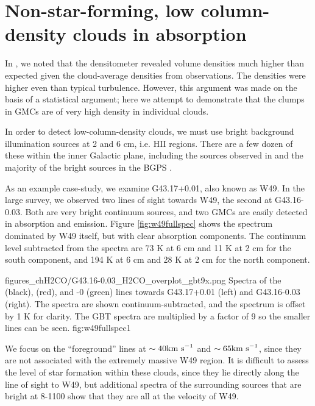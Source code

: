 \section{Non-star-forming, low column-density clouds in absorption}
In \citet{Ginsburg2011a}, we noted that the \formaldehyde densitometer revealed
volume densities much higher than expected given the cloud-average densities
from \thirteenco observations.  The densities were higher even than typical
turbulence.  However, this argument was made on the basis of a statistical argument;
here we attempt to demonstrate that the clumps in GMCs are of very high density
in individual clouds.

In order to detect low-column-density clouds, we must use bright background
illumination sources at 2 and 6 cm, i.e. HII regions.  There are a few dozen of
these within the inner Galactic plane, including the sources observed in
\citet{Ginsburg2011a} and the majority of the bright sources in the BGPS
\citep{Ginsburg2012}.

As an example case-study, we examine G43.17+0.01, also known as W49.  In the
large survey, we observed two lines of sight towards W49, the second at
G43.16-0.03.  Both are very bright continuum sources, and two GMCs are easily
detected in \formaldehyde absorption and \thirteenco emission.  Figure
\ref{fig:w49fullspec} shows the spectrum dominated by W49 itself, but with
clear absorption components.  The continuum level subtracted from the spectra
are 73 K at 6 cm and 11 K at 2 cm for the south component, and 194 K at 6 cm
and 28 K at 2 cm for the north component.

{figures_chH2CO/G43.16-0.03_H2CO_overplot_gbt9x.png}
{Spectra of the \formaldehyde \oneone (black), \twotwo (red), and -0 (green) lines towards G43.17+0.01 (left) and G43.16-0.03 (right).
The \formaldehyde spectra are shown continuum-subtracted, and the \thirteenco
spectrum is offset by 1 K for clarity.  The GBT \twotwo spectra are multiplied
by a factor of 9 so the smaller lines can be seen.
}{fig:w49fullspec}{1}

We focus on the ``foreground'' lines at $\sim40 \textrm{km~s}^{-1}$ and $\sim65 \textrm{km~s}^{-1}$, since
they are not associated with the extremely massive W49 region.  It is difficult
to assess the level of star formation within these clouds, since they lie
directly along the line of sight to W49, but additional \formaldehyde spectra
of the surrounding sources that are bright at 8-1100 \um show that they are all
at the velocity of W49.  


